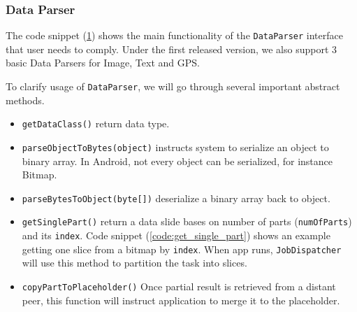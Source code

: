 \documentclass[conference]{IEEEtran}
\begin{document}
\subsubsection{Data Parser}
The code snippet (\ref{data_parser}) shows the main functionality of the \texttt{DataParser} interface that user needs to comply. Under the first released version, we also support 3 basic Data Parsers for Image, Text and GPS.\\

\begin{figure}
\noindent {}	
  \label{data_parser}
\end{figure}

To clarify usage of \texttt{DataParser}, we will go through several important abstract methods.

\begin{itemize}
	\item \texttt{getDataClass()} return data type.
	\item \texttt{parseObjectToBytes(object)} instructs system to serialize an object to binary array. In Android, not every object can be serialized, for instance Bitmap.  
	\item \texttt{parseBytesToObject(byte[])} deserialize a binary array back to object.
	\item \texttt{getSinglePart()} return a data slide bases on number of parts (\texttt{numOfParts}) and its \texttt{index}. Code snippet (\ref{code:get_single_part}) shows an example getting one slice from a bitmap by \texttt{index}. When app runs, \texttt{JobDispatcher} will use this method to partition the task into slices.
	\item \texttt{copyPartToPlaceholder()} Once partial result is retrieved from a distant peer, this function will instruct application to merge it to the placeholder.
\end{itemize}
\end{document}
